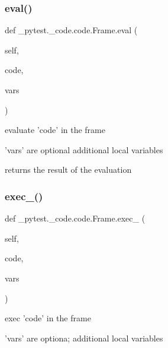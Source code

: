 \subsubsection{\texorpdfstring{eval()}{eval()}}
{\footnotesize\ttfamily def \+\_\+pytest.\+\_\+code.\+code.\+Frame.\+eval (\begin{DoxyParamCaption}\item[{}]{self,  }\item[{}]{code,  }\item[{}]{vars }\end{DoxyParamCaption})}

\begin{DoxyVerb}evaluate 'code' in the frame

    'vars' are optional additional local variables

    returns the result of the evaluation
\end{DoxyVerb}
 \mbox{\label{class__pytest_1_1__code_1_1code_1_1_frame_a6ef6fdc82162cc934af75969700dca82}} 
\subsubsection{\texorpdfstring{exec\+\_\+()}{exec\_()}}
{\footnotesize\ttfamily def \+\_\+pytest.\+\_\+code.\+code.\+Frame.\+exec\+\_\+ (\begin{DoxyParamCaption}\item[{}]{self,  }\item[{}]{code,  }\item[{}]{vars }\end{DoxyParamCaption})}

\begin{DoxyVerb}exec 'code' in the frame

    'vars' are optiona; additional local variables
\end{DoxyVerb}
 \mbox{\label{class__pytest_1_1__code_1_1code_1_1_frame_a11a32c449e6caa70aecb0048d7af3ac2}} 
